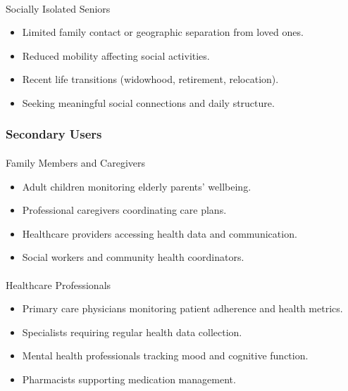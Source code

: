 \documentclass[
  letterpaper,
  DIV=11,
  numbers=noendperiod]{scrartcl}
\makeatletter
\let\oldparagraph\paragraph
\renewcommand{\paragraph}{
    \@ifstar
      \xxxParagraphStar
      \xxxParagraphNoStar
  }
\newcommand{\xxxParagraphStar}[1]{\oldparagraph*{#1}\mbox{}}
\newcommand{\xxxParagraphNoStar}[1]{\oldparagraph{#1}\mbox{}}
\providecommand{\tightlist}{%
  \setlength{\itemsep}{0pt}\setlength{\parskip}{0pt}}\usepackage{longtable,booktabs,array}
\makeatother
\begin{document}
\paragraph{Socially Isolated Seniors}\label{socially-isolated-seniors}

\begin{itemize}
\tightlist
\item
  Limited family contact or geographic separation from loved ones.
\item
  Reduced mobility affecting social activities.
\item
  Recent life transitions (widowhood, retirement, relocation).
\item
  Seeking meaningful social connections and daily structure.
\end{itemize}

\subsubsection{Secondary Users}\label{secondary-users}

\paragraph{Family Members and
Caregivers}\label{family-members-and-caregivers}

\begin{itemize}
\tightlist
\item
  Adult children monitoring elderly parents' wellbeing.
\item
  Professional caregivers coordinating care plans.
\item
  Healthcare providers accessing health data and communication.
\item
  Social workers and community health coordinators.
\end{itemize}

\paragraph{Healthcare Professionals}\label{healthcare-professionals}

\begin{itemize}
\tightlist
\item
  Primary care physicians monitoring patient adherence and health
  metrics.
\item
  Specialists requiring regular health data collection.
\item
  Mental health professionals tracking mood and cognitive function.
\item
  Pharmacists supporting medication management.
\end{itemize}
\end{document}
